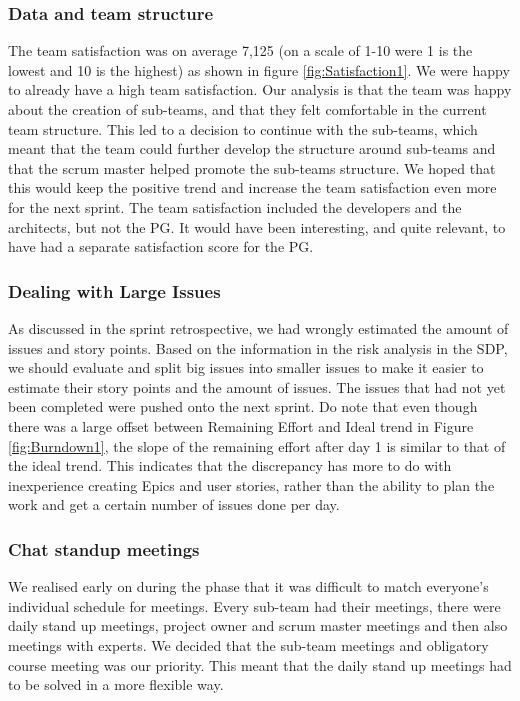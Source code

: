 \documentclass{article}
\begin{document}
\subsubsection{Data and team structure}

The team satisfaction was on average 7,125 (on a scale of 1-10 were 1 is the lowest and 10 is the highest) as shown in figure \ref{fig:Satisfaction1}. We were happy to already have a high team satisfaction. Our analysis is that the team was happy about the creation of sub-teams, and that they felt comfortable in the current team structure. This led to a decision to continue with the sub-teams, which meant that the team could further develop the structure around sub-teams and that the scrum master helped promote the sub-teams structure. We hoped that this would keep the positive trend and increase the team satisfaction even more for the next sprint. The team satisfaction included the developers and the architects, but not the PG. It would have been interesting, and quite relevant, to have had a separate satisfaction score for the PG.

\subsubsection{Dealing with Large Issues}
As discussed in the sprint retrospective, we had wrongly estimated the amount of issues and story points. Based on the information in the risk analysis in the SDP, we should evaluate and split big issues into smaller issues to make it easier to estimate their story points and the amount of issues. The issues that had not yet been completed were pushed onto the next sprint. Do note that even though there was a large offset between Remaining Effort and Ideal trend in Figure \ref{fig:Burndown1}, the slope of the remaining effort after day 1 is similar to that of the ideal trend. This indicates that the discrepancy has more to do with inexperience creating Epics and user stories, rather than the ability to plan the work and get a certain number of issues done per day.

\subsubsection{Chat standup meetings}
We realised early on during the phase that it was difficult to match everyone's individual schedule for meetings. Every sub-team had their meetings, there were daily stand up meetings, project owner and scrum master meetings and then also meetings with experts. We decided that the sub-team meetings and obligatory course meeting was our priority. This meant that the daily stand up meetings had to be solved in a more flexible way. 
\end{document}
